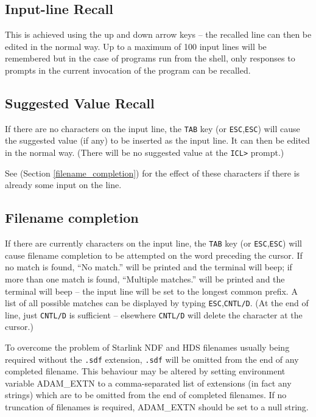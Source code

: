 \documentclass[twoside,11pt,nolof]{starlink}
\begin{document}
\subsection{Input-line Recall}
This is achieved using the up and down arrow keys -- the recalled line can
then be edited in the normal way.
Up to a maximum of 100 input lines will be remembered but in the case of
programs run from the shell, only responses to prompts in the current
invocation of the program can be recalled.

\subsection{Suggested Value Recall}
If there are no characters on the input line, the \texttt{TAB} key (or
\texttt{ESC},\texttt{ESC}) will cause the suggested value (if any) to be
inserted as the  input line. It can then be edited in the normal way.
(There will be no suggested value at the \texttt{ICL>} prompt.)

See
(Section \ref{filename_completion}) for the effect of these
characters if there is already some input on the line.

\subsection{\label{filename_completion}Filename completion}
If there are currently characters on the input line, the \texttt{TAB} key (or
\texttt{ESC},\texttt{ESC}) will cause filename completion to be attempted on
the word preceding the cursor.
If no match is found, ``No match.'' will be printed and the terminal will beep;
if more than one match is found, ``Multiple matches.'' will be printed and the
terminal will beep -- the input line will be set to the longest common
prefix.
A list of all possible matches can be displayed by typing
\texttt{ESC},\texttt{CNTL/D}. (At the end of line, just \texttt{CNTL/D} is
sufficient -- elsewhere \texttt{CNTL/D} will delete the character at the
cursor.)

To overcome the problem of Starlink NDF and HDS filenames usually being
required without the \texttt{.sdf} extension, \texttt{.sdf} will be omitted
from the end of any completed filename.
This behaviour may be altered by setting environment variable
ADAM\_EXTN to a comma-separated list of extensions (in fact any strings)
which are to be omitted from the end of completed filenames.
If no truncation of filenames is required, ADAM\_EXTN should be set to a null
string.
\end{document}
